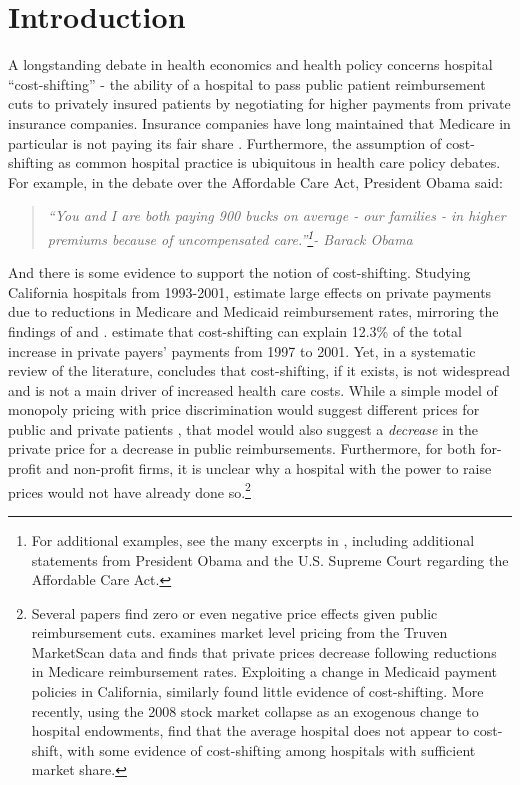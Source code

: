 \documentclass[12pt]{article}
\begin{document}
\newpage
\section{Introduction}
A longstanding debate in health economics and health policy concerns hospital ``cost-shifting'' - the ability of a hospital to pass public patient reimbursement cuts to privately insured patients by negotiating for higher payments from private insurance companies.  Insurance companies have long maintained that Medicare in particular is not paying its fair share \citep{frakt2011}.  Furthermore, the assumption of cost-shifting as common hospital practice is ubiquitous in health care policy debates.  For example, in the debate over the Affordable Care Act, President Obama said:
\begin{quote}
\textit{``You and I are both paying 900 bucks on average - our families - in higher premiums because of uncompensated care.''\footnote{For additional examples, see the many excerpts in \cite{dranove2017}, including additional statements from President Obama and the U.S. Supreme Court regarding the Affordable Care Act.}- Barack Obama}
\end{quote}
And there is some evidence to support the notion of cost-shifting. Studying California hospitals from 1993-2001, \cite{zwanziger2006} estimate large effects on private payments due to reductions in Medicare and Medicaid reimbursement rates, mirroring the findings of \cite{lee2003} and \cite{zwanziger2000}. \cite{zwanziger2006} estimate that cost-shifting can explain 12.3\% of the total increase in private payers' payments from 1997 to 2001.  Yet, in a systematic review of the literature, \citet{frakt2011} concludes that cost-shifting, if it exists, is not widespread and is not a main driver of increased health care costs.   While a simple model of monopoly pricing with price discrimination would suggest different prices for public and private patients \citep{hay1983}, that model would also suggest a \textit{decrease} in the private price for a decrease in public reimbursements.  Furthermore, for both for-profit and non-profit firms, it is unclear why a hospital with the power to raise prices would not have already done so.\footnote{Several papers find zero or even negative price effects given public reimbursement cuts. \cite{white2013} examines market level pricing from the Truven MarketScan data and finds that private prices decrease following reductions in Medicare reimbursement rates. Exploiting a change in Medicaid payment policies in California, \citet{dranove1998} similarly found little evidence of cost-shifting. More recently, using the 2008 stock market collapse as an exogenous change to hospital endowments, \cite{dranove2017} find that the average hospital does not appear to cost-shift, with some evidence of cost-shifting among hospitals with sufficient market share.}
\end{document}

